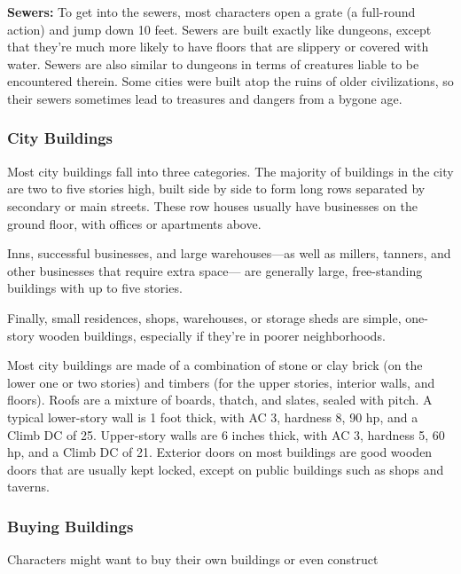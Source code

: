 \documentclass{article}
\begin{document}
\textbf{Sewers:} To get into the sewers, most characters open a grate (a full-round 
action) and jump down 10 feet. Sewers are built exactly like dungeons, except that 
they're much more likely to have floors that are slippery or covered with water. 
Sewers are also similar to dungeons in terms of creatures liable to be encountered 
therein. Some cities were built atop the ruins of older civilizations, so their 
sewers sometimes lead to treasures and dangers from a bygone age.

\vspace{12pt}
\subsubsection*{\textbf{City Buildings}}

Most city buildings fall into three categories. The majority of buildings in the 
city are two to five stories high, built side by side to form long rows separated 
by secondary or main streets. These row houses usually have businesses on the ground 
floor, with offices or apartments above.

Inns, successful businesses, and large warehouses---as well as millers, tanners, 
and other businesses that require extra space--- are generally large, free-standing 
buildings with up to five stories. 

Finally, small residences, shops, warehouses, or storage sheds are simple, one-story 
wooden buildings, especially if they're in poorer neighborhoods.

Most city buildings are made of a combination of stone or clay brick (on the lower 
one or two stories) and timbers (for the upper stories, interior walls, and floors). 
Roofs are a mixture of boards, thatch, and slates, sealed with pitch. A typical 
lower-story wall is 1 foot thick, with AC 3, hardness 8, 90 hp, and a Climb DC 
of 25. Upper-story walls are 6 inches thick, with AC 3, hardness 5, 60 hp, and 
a Climb DC of 21. Exterior doors on most buildings are good wooden doors that are 
usually kept locked, except on public buildings such as shops and taverns.

\vspace{12pt}
\subsubsection*{\textbf{Buying Buildings}}

Characters might want to buy their own buildings or even construct
\end{document}
